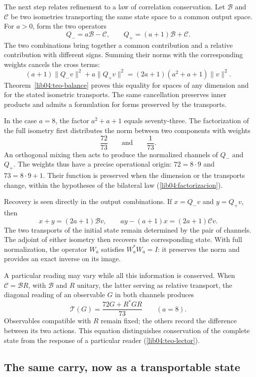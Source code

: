 The next step relates refinement to a law of
correlation conservation. Let \(\mathcal B\) and
\(\mathcal C\) be two isometries transporting the same state space
to a common output space. For \(a>0\), form the
two operators
\[
 Q_-=a\mathcal B-\mathcal C,\qquad
 Q_+=(a+1)\mathcal B+\mathcal C.
\]
The two combinations bring together a common contribution and a
relative contribution with different signs. Summing their norms
with the corresponding weights cancels the cross terms:
\[
 (a+1)\|Q_-v\|^2+a\|Q_+v\|^2
   =(2a+1)(a^2+a+1)\|v\|^2.
\]
Theorem~\ref{lib04:teo-balance} proves this equality for spaces of any
dimension and for the stated isometric
transports. The same cancellation preserves inner products and
admits a formulation for forms preserved by the transports.

In the case \(a=8\), the factor \(a^2+a+1\) equals seventy-three.
The factorization of the full isometry first distributes the
norm between two components with weights
\[
 \frac{72}{73}\qquad\text{and}\qquad\frac{1}{73}.
\]
An orthogonal mixing then acts to produce the normalized
channels of \(Q_-\) and \(Q_+\). The weights thus have a
precise operational origin: \(72=8\cdot9\) and
\(73=8\cdot9+1\). Their function is preserved when the dimension
or the transports change, within the hypotheses of the bilateral law
(\cref{lib04:factorizacion}).

Recovery is seen directly in the output combinations.
If \(x=Q_-v\) and \(y=Q_+v\), then
\[
 x+y=(2a+1)\mathcal Bv,\qquad
 ay-(a+1)x=(2a+1)\mathcal Cv.
\]
The two transports of the initial state remain determined by
the pair of channels. The adjoint of either isometry
then recovers the corresponding state. With full
normalization, the operator \(W_a\) satisfies \(W_a^*W_a=I\):
it preserves the norm and provides an exact inverse on its image.

A particular reading may vary while all this
information is conserved. When \(\mathcal C=\mathcal B R\), with
\(\mathcal B\) and \(R\) unitary, the latter serving as relative transport, the
diagonal reading of an observable \(G\) in both channels produces
\[
 \mathcal T(G)=\frac{72G+R^*GR}{73}
 \qquad(a=8).
\]
Observables compatible with \(R\) remain fixed; the others
record the difference between its two actions. This equation distinguishes
conservation of the complete state from the response of a particular
reader (\cref{lib04:teo-lector}).

\subsection*{The same carry, now as a transportable state}
\label{libnar:ejemplo}

